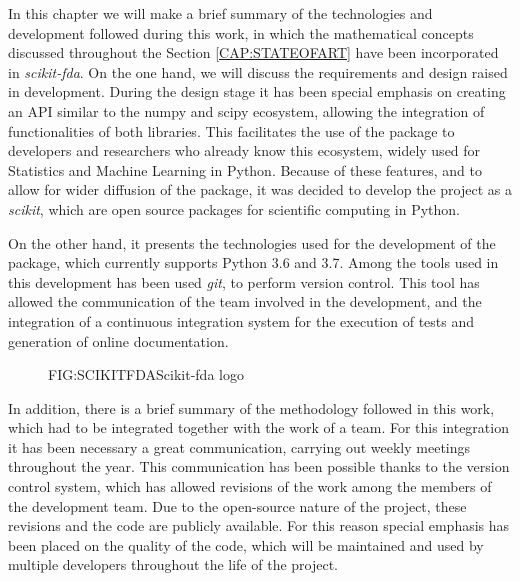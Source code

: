 
In this chapter we will make a brief summary of the technologies and development
followed during this work, in which the mathematical concepts discussed
throughout the Section \ref{CAP:STATEOFART} have been incorporated in
\textit{scikit-fda}. On the one hand, we will discuss the requirements and
design raised in development. During the design stage it has been special
emphasis on creating an \acs{API} similar to the numpy and scipy ecosystem, allowing
the integration of functionalities of both libraries. This facilitates the use
of the package to developers and researchers who already know this ecosystem,
widely used for Statistics and Machine Learning in Python. Because of these
features, and to allow for wider diffusion of the package, it was decided to
develop the project as a \textit{scikit}, which are open source packages for
scientific computing in Python.


On the other hand, it presents the technologies used for the development of
the package, which currently supports Python 3.6 and 3.7.
Among the tools used in this development has been used \textit{git},
to perform version control. This tool has allowed the communication of the team
involved in the development, and the integration of a continuous integration
system for the execution of tests and generation of online documentation.

\begin{figure}[Scikit-fda logo]{FIG:SCIKITFDA}{Scikit-fda logo}
\end{figure}

In addition, there is a brief summary of the methodology followed in this work,
which had to be integrated together with the work of a team.
For this integration it has been necessary a great communication,
carrying out weekly meetings throughout the year. This communication has
been possible thanks to the version control system, which has allowed
revisions of the work among the members of the development team.
 Due to the open-source nature of the project, these revisions and the code
 are publicly available. For this reason special emphasis has been placed on
 the quality of the code, which will be maintained and used by multiple
 developers throughout the life of the project.
